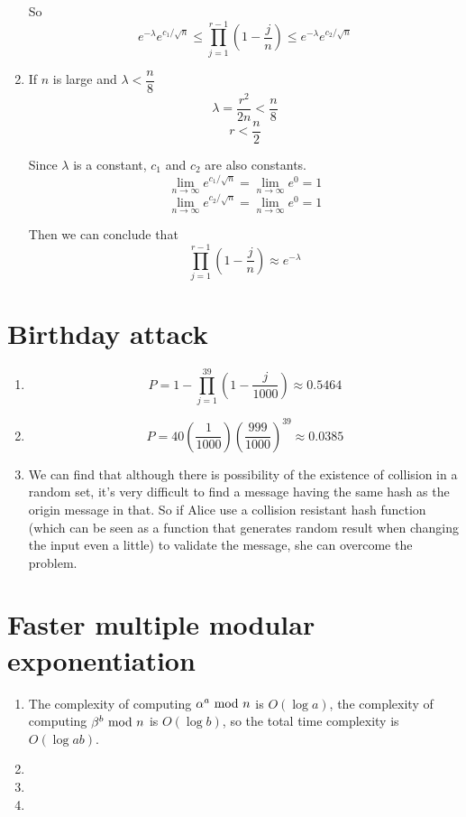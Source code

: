 \documentclass{article}
\renewcommand{\mod}{{\rm\ mod\ }}
\begin{document}
\begin{enumerate}
So $$e^{-\lambda}e^{c_1/\sqrt{n}} \leqslant \prod_{j=1}^{r-1} \left(1-\frac{j}{n}\right) \leqslant e^{-\lambda}e^{c_2/\sqrt{n}}$$

\item
If $n$ is large and $\lambda<\dfrac{n}{8}$
$$\lambda=\frac{r^2}{2n}<\frac{n}{8}$$
$$r<\frac{n}{2}$$

Since $\lambda$ is a constant, $c_1$ and $c_2$ are also constants.
$$\lim_{n\to\infty}e^{c_1/\sqrt{n}}=\lim_{n\to\infty}e^0=1$$
$$\lim_{n\to\infty}e^{c_2/\sqrt{n}}=\lim_{n\to\infty}e^0=1$$

Then we can conclude that
$$\prod_{j=1}^{r-1} \left(1-\frac{j}{n}\right) \approx e^{-\lambda}$$
\end{enumerate}

\section{Birthday attack}
\begin{enumerate}
\item
$$P=1-\prod_{j=1}^{39}\left(1-\frac{j}{1000}\right)\approx0.5464$$
\item
$$P=40\left(\frac{1}{1000}\right)\left(\frac{999}{1000}\right)^{39}\approx0.0385$$
\item
We can find that although there is possibility of the existence of collision in a random set, it's very difficult to find a message having the same hash as the origin message in that. So if Alice use a collision resistant hash function (which can be seen as a function that generates random result when changing the input even a little) to validate the message, she can overcome the problem.

\end{enumerate}

\section{Faster multiple modular exponentiation}
\begin{enumerate}
\item
The complexity of computing $\alpha^a\mod n$ is $O(\log a)$, the complexity of computing $\beta^b\mod n$ is $O(\log b)$, so the total time complexity is $O(\log ab)$.
\item

\item
\item
\end{enumerate}
\end{document}
